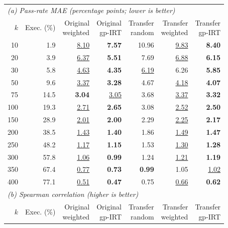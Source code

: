 \begin{table}[t]
  \centering
  \scriptsize
  \setlength{\tabcolsep}{3.5pt}
  \begin{tabular}{rrrrrrr}
    \toprule
    \multicolumn{7}{l}{\textit{(a) Pass-rate MAE (percentage points; lower is better)}} \\
    $k$ & Exec. (\%) & \shortstack{Original\\weighted} & \shortstack{Original\\gp-IRT} & \shortstack{Transfer\\random} & \shortstack{Transfer\\weighted} & \shortstack{Transfer\\gp-IRT} \\
    \midrule
    10 & 1.9 & \underline{8.10} & \textbf{7.57} & 10.96 & \underline{9.83} & \textbf{8.40} \\
    20 & 3.9 & \underline{6.37} & \textbf{5.51} & 7.69 & \underline{6.88} & \textbf{6.15} \\
    30 & 5.8 & \underline{4.63} & \textbf{4.35} & \underline{6.19} & 6.26 & \textbf{5.85} \\
    50 & 9.6 & \underline{3.37} & \textbf{3.28} & 4.67 & \underline{4.18} & \textbf{4.07} \\
    75 & 14.5 & \textbf{3.04} & \underline{3.05} & 3.68 & \underline{3.37} & \textbf{3.32} \\
    100 & 19.3 & \underline{2.71} & \textbf{2.65} & 3.08 & \underline{2.52} & \textbf{2.50} \\
    150 & 28.9 & \underline{2.01} & \textbf{2.00} & 2.29 & \underline{2.25} & \textbf{2.17} \\
    200 & 38.5 & \underline{1.43} & \textbf{1.40} & 1.86 & \underline{1.49} & \textbf{1.47} \\
    250 & 48.2 & \underline{1.17} & \textbf{1.15} & 1.53 & \underline{1.30} & \textbf{1.28} \\
    300 & 57.8 & \underline{1.06} & \textbf{0.99} & 1.24 & \underline{1.21} & \textbf{1.19} \\
    350 & 67.4 & \underline{0.77} & \textbf{0.73} & \textbf{0.99} & 1.05 & \underline{1.02} \\
    400 & 77.1 & \underline{0.51} & \textbf{0.47} & 0.75 & \underline{0.66} & \textbf{0.62} \\
    \midrule
    \multicolumn{7}{l}{\textit{(b) Spearman correlation (higher is better)}} \\
    $k$ & Exec. (\%) & \shortstack{Original\\weighted} & \shortstack{Original\\gp-IRT} & \shortstack{Transfer\\random} & \shortstack{Transfer\\weighted} & \shortstack{Transfer\\gp-IRT} \\

\end{tabular}
\end{table}
